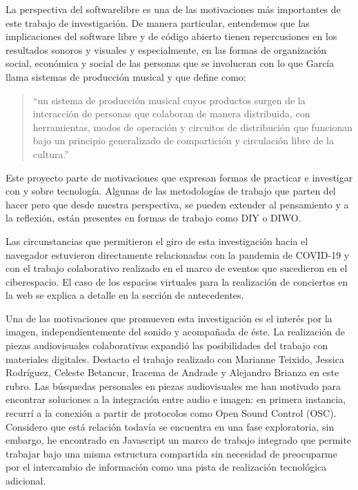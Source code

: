 La perspectiva del \gls{softwarelibre} es una de las motivaciones más importantes de este trabajo de investigación. De manera particular, entendemos que las implicaciones del software libre y de código abierto tienen repercusiones en los resultados sonoros y visuales y especialmente, en las formas de organización social, económica y social de las personas que se involucran con lo que García llama sistemas de producción musical y que define como:

\begin{quote}

  ``un sistema de producción musical cuyos productos surgen de la interacción de personas que colaboran de manera distribuida, con herramientas, modos de operación y circuitos de distribución que funcionan bajo un principio generalizado de compartición y circulación libre de la cultura.''\citep[p.~65]{jorgeDavid2021}

\end{quote}

Este proyecto parte de motivaciones que expresan formas de practicar e investigar con y sobre tecnología. Algunas de las metodologías de trabajo que parten del hacer pero que desde nuestra perspectiva, se pueden extender al pensamiento y a la reflexión, están presentes en formas de trabajo como DIY o DIWO.

Las circunstancias que permitieron el giro de esta investigación hacia el navegador estuvieron directamente relacionadas con la pandemia de COVID-19 y con el trabajo colaborativo realizado en el marco de eventos que sucedieron en el ciberespacio. El caso de los espacios virtuales para la realización de conciertos en la web se explica a detalle en la sección de antecedentes. 

Una de las motivaciones que promueven esta investigación es el interés por la imagen, independientemente del sonido y acompañada de éste. La realización de piezas audiovisuales colaborativas expandió las posibilidades del trabajo con materiales digitales. Destacto el trabajo realizado con Marianne Teixido, Jessica Rodríguez, Celeste Betancur, Iracema de Andrade y Alejandro Brianza en este rubro. Las búsquedas personales en piezas audiovisuales me han motivado para encontrar soluciones a la integración entre audio e imagen: en primera instancia, recurrí a la conexión a partir de protocolos como Open Sound Control (\Gls{OSC}). Considero que está relación todavía se encuentra en una fase exploratoria, sin embargo, he encontrado en Javascript un marco de trabajo integrado que permite trabajar bajo una misma estructura compartida sin necesidad de preocuparme por el intercambio de información como una pista de realización tecnológica adicional.  


